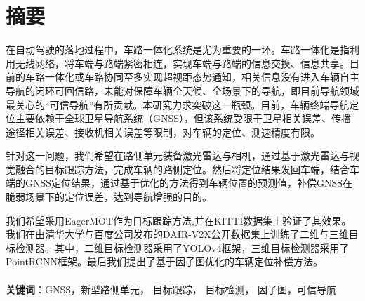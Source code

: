 \newpage
{}

\section*{摘\quad 要}

\hspace{8mm}

在自动驾驶的落地过程中，车路一体化系统是尤为重要的一环。车路一体化是指利用无线网络，将车端与路端紧密相连，实现车端与路端的信息交换、信息共享。目前的车路一体化或车路协同至多实现超视距态势通知，相关信息没有进入车辆自主导航的闭环可回信路，未能对保障车辆全天候、全场景下的导航，即目前导航领域最关心的“可信导航”有所贡献。本研究力求突破这一瓶颈。目前，车辆终端导航定位主要依赖于全球卫星导航系统（GNSS），但该系统受限于卫星相关误差、传播途径相关误差、接收机相关误差等限制，对车辆的定位、测速精度有限。\par

针对这一问题，我们希望在路侧单元装备激光雷达与相机，通过基于激光雷达与视觉融合的目标跟踪方法，完成车辆的路侧定位。然后将定位结果发回车端，结合车端的GNSS定位结果，通过基于优化的方法得到车辆位置的预测值，补偿GNSS在脆弱场景下的定位误差，达到导航增强的目的。\par

我们希望采用EagerMOT作为目标跟踪方法,并在KITTI\cite{geiger2013vision}数据集上验证了其效果。我们在由清华大学与百度公司发布的DAIR-V2X公开数据集上训练了二维与三维目标检测器。其中，二维目标检测器采用了YOLOv4框架，三维目标检测器采用了PointRCNN框架。最后我们提出了基于因子图优化的车辆定位补偿方法。\\

~\\
\textbf{关键词}：GNSS，新型路侧单元， 目标跟踪， 目标检测， 因子图，可信导航\\
